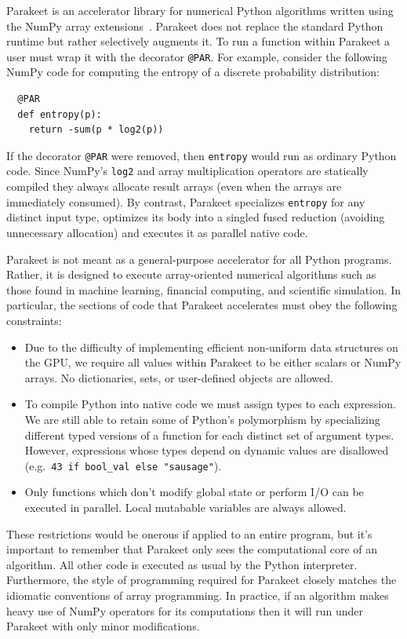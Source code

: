 \documentclass[10pt,twocolumn]{article}
\begin{document}
Parakeet is an accelerator library for numerical Python algorithms written using the NumPy array extensions~\cite{Oliphant07}. Parakeet does not replace the standard Python runtime but rather selectively augments it. To run a function within Parakeet a user must wrap it with the decorator \lstinline{@PAR}. For example, consider the following NumPy code for computing the entropy of a discrete probability distribution: 
\begin{lstlisting}
  @PAR
  def entropy(p):
    return -sum(p * log2(p))
\end{lstlisting}
If the decorator \lstinline{@PAR} were removed, then \lstinline{entropy} would run as ordinary Python code. Since NumPy's \lstinline{log2} and array multiplication operators are statically compiled they always allocate result arrays (even when the arrays are immediately consumed). By contrast, Parakeet specializes \lstinline{entropy} for any distinct input type, optimizes its body into a singled fused reduction (avoiding unnecessary allocation) and executes it as parallel native code.

Parakeet is not meant as a general-purpose accelerator for all Python programs.  Rather, it is designed to execute array-oriented numerical algorithms such as those found in machine learning, financial computing, and scientific simulation. In particular, the sections of code that Parakeet accelerates must obey the following constraints:

\begin{itemize}
 \item Due to the difficulty of implementing efficient non-uniform data structures on the GPU, we require all values within Parakeet to be either scalars or NumPy arrays. No dictionaries, sets, or user-defined objects are allowed. 
 \item To compile Python into native code we must assign types to each expression. We are still able to retain some of Python's polymorphism by specializing different typed versions of a function for each distinct set of argument types. However, expressions whose types depend on dynamic values are disallowed (e.g.~\lstinline{43 if bool_val else "sausage"}).
 \item Only functions which don't modify global state or perform I/O can be executed in parallel. Local mutabable variables are  always allowed.
\end{itemize}

These restrictions would be onerous if applied to an entire program, but it's important to remember that Parakeet only sees the computational core of an algorithm. All other code is executed as usual by the Python interpreter. Furthermore, the style of programming required for Parakeet closely matches the idiomatic conventions of array programming. In practice, if an algorithm makes heavy use of NumPy operators for its computations then it will run under Parakeet with only minor modifications.
\end{document}
